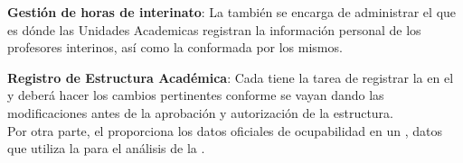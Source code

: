 \begin{ADescripcion}
    \item \textbf{Gestión de horas de interinato}: La  también se encarga de administrar el  que es dónde las  Unidades Academicas registran la información personal de los profesores interinos, así como la  conformada por los mismos.
	\item \textbf{Registro de Estructura Académica}: Cada  tiene la tarea de registrar la  en el 	y deberá hacer los cambios pertinentes conforme se vayan dando las modificaciones antes de la aprobación y autorización de la estructura.\\ 
	Por otra parte, el  proporciona los datos oficiales de ocupabilidad en un , datos que utiliza la  para el análisis de la .

	
\end{ADescripcion}
